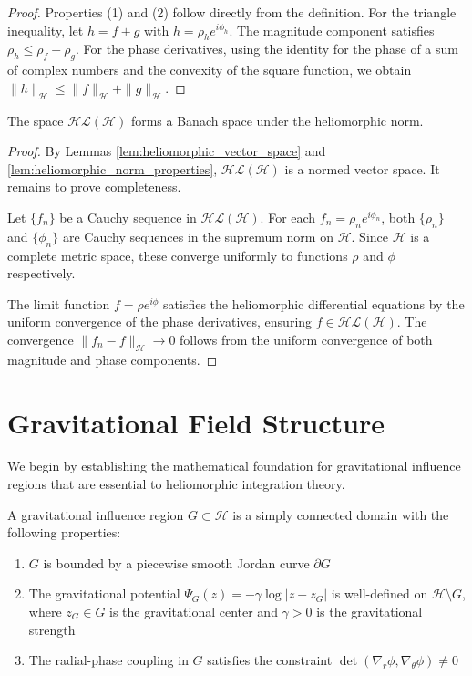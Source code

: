 \begin{proof}
Properties (1) and (2) follow directly from the definition. For the triangle inequality, let $h = f + g$ with $h = \rho_h e^{i\phi_h}$. The magnitude component satisfies $\rho_h \leq \rho_f + \rho_g$. For the phase derivatives, using the identity for the phase of a sum of complex numbers and the convexity of the square function, we obtain $\|h\|_{\mathcal{H}} \leq \|f\|_{\mathcal{H}} + \|g\|_{\mathcal{H}}$.
\end{proof}

\begin{theorem}
\label{thm:heliomorphic_banach_space}
The space $\mathcal{HL}(\mathcal{H})$ forms a Banach space under the heliomorphic norm.
\end{theorem}

\begin{proof}
By Lemmas \ref{lem:heliomorphic_vector_space} and \ref{lem:heliomorphic_norm_properties}, $\mathcal{HL}(\mathcal{H})$ is a normed vector space. It remains to prove completeness.

Let $\{f_n\}$ be a Cauchy sequence in $\mathcal{HL}(\mathcal{H})$. For each $f_n = \rho_n e^{i\phi_n}$, both $\{\rho_n\}$ and $\{\phi_n\}$ are Cauchy sequences in the supremum norm on $\mathcal{H}$. Since $\mathcal{H}$ is a complete metric space, these converge uniformly to functions $\rho$ and $\phi$ respectively.

The limit function $f = \rho e^{i\phi}$ satisfies the heliomorphic differential equations by the uniform convergence of the phase derivatives, ensuring $f \in \mathcal{HL}(\mathcal{H})$. The convergence $\|f_n - f\|_{\mathcal{H}} \to 0$ follows from the uniform convergence of both magnitude and phase components.
\end{proof}

\section{Gravitational Field Structure}

We begin by establishing the mathematical foundation for gravitational influence regions that are essential to heliomorphic integration theory.

\begin{definition}
\label{def:gravitational_influence_region}
A gravitational influence region $G \subset \mathcal{H}$ is a simply connected domain with the following properties:
\begin{enumerate}
\item $G$ is bounded by a piecewise smooth Jordan curve $\partial G$
\item The gravitational potential $\Psi_G(z) = -\gamma \log|z - z_G|$ is well-defined on $\mathcal{H} \setminus G$, where $z_G \in G$ is the gravitational center and $\gamma > 0$ is the gravitational strength
\item The radial-phase coupling in $G$ satisfies the constraint $\det(\nabla_r \phi, \nabla_\theta \phi) \neq 0$
\end{enumerate}
\end{definition}

